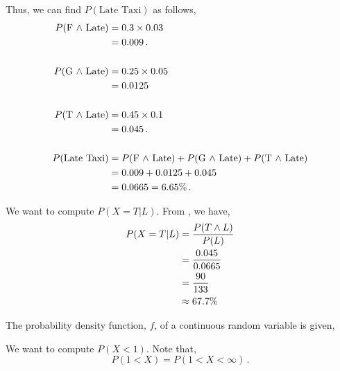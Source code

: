 \begin{subquestions}
\begin{subsubquestions}
Thus, we can find $P(\text{Late Taxi})$ as follows,
\begin{align}
	P(\text{F $\land$ Late}) & = 0.3 \times 0.03 \nonumber \\
	                       & = 0.009 \,. \\ \nonumber \\
	P(\text{G $\land$ Late}) & = 0.25 \times 0.05 \nonumber \\
	 					   & = 0.0125 \, \\ \nonumber \\
	P(\text{T $\land$ Late}) & = 0.45 \times 0.1 \nonumber \\
	 					   & = 0.045 \,.  \\ \nonumber \\       
	P(\text{Late Taxi}) & = P(\text{F $\land$ Late}) + P(\text{G $\land$ Late}) + P(\text{T $\land$ Late}) \nonumber \\
	                    & = 0.009+0.0125+0.045 \nonumber \\
	                    & = 0.0665 = 6.65\% \,.					              
\end{align}


\subsubquestion

We want to compute $P(X=T| L)$. From , we have,
\begin{align}
	P(X=T| L) & = \frac{P(T \land L)}{P(L)} \nonumber \\
	                      & = \frac{0.045}{0.0665} \nonumber \\
	                      & = \frac{90}{133} \nonumber \\ 
	                      & \approx 67.7\%
\end{align}

\end{subsubquestions}


\subquestion

The probability density function, $f$, of a continuous random variable is given,
\begin{subsubquestions}
	
\subsubquestion

We want to compute $P(X<1)$. Note that,
\begin{equation}
	P(1<X) = P(1<X<\infty) \,.
\end{equation}


\end{subsubquestions}
\end{subquestions}
